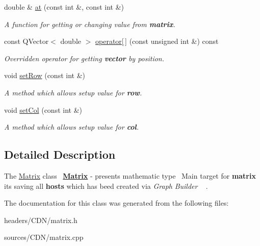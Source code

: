 \begin{DoxyCompactItemize}
\mbox{\label{class_matrix_aca6cbcde0e76b00986004ce1692215ba}} 
double \& \mbox{\hyperlink{class_matrix_aca6cbcde0e76b00986004ce1692215ba}{at}} (const int \&, const int \&)
\begin{DoxyCompactList}\small\item\em A {\itshape function} for getting or changing value from {\bfseries{matrix}}. \end{DoxyCompactList}\item 
\mbox{\label{class_matrix_a5fb6b735528152839ded32b95c872a9e}} 
const Q\+Vector$<$ double $>$ \mbox{\hyperlink{class_matrix_a5fb6b735528152839ded32b95c872a9e}{operator\mbox{[}$\,$\mbox{]}}} (const unsigned int \&) const
\begin{DoxyCompactList}\small\item\em Overridden {\itshape operator} for getting {\bfseries{vector}} by position. \end{DoxyCompactList}\item 
\mbox{\label{class_matrix_a6d6443701cb44fb694247c6561919e6d}} 
void \mbox{\hyperlink{class_matrix_a6d6443701cb44fb694247c6561919e6d}{set\+Row}} (const int \&)
\begin{DoxyCompactList}\small\item\em A {\itshape method} which allows setup value for {\bfseries{row}}. \end{DoxyCompactList}\item 
\mbox{\label{class_matrix_a158715db79af208837f5fb7be248aeaa}} 
void \mbox{\hyperlink{class_matrix_a158715db79af208837f5fb7be248aeaa}{set\+Col}} (const int \&)
\begin{DoxyCompactList}\small\item\em A {\itshape method} which allows setup value for {\bfseries{col}}. \end{DoxyCompactList}\end{DoxyCompactItemize}


\subsection{Detailed Description}
The \mbox{\hyperlink{class_matrix}{Matrix}} class~\newline
{\bfseries{\mbox{\hyperlink{class_matrix}{Matrix}}}} -\/ presents mathematic type~\newline
Main target for {\bfseries{matrix}} it\textquotesingle{}s saving all {\bfseries{hosts}} which has beed created via {\itshape Graph} {\itshape Builder} ~\newline
. 

The documentation for this class was generated from the following files\+:\begin{DoxyCompactItemize}
\item 
headers/\+C\+D\+N/matrix.\+h\item 
sources/\+C\+D\+N/matrix.\+cpp\end{DoxyCompactItemize}
